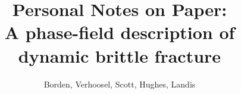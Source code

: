 \documentclass[12pt,3p]{article}
\numberwithin{equation}{section}
\begin{document}
\title{Personal Notes on Paper: \\
	\large{A phase-field description of dynamic brittle fracture}}
\author{Borden, Verhoosel, Scott, Hughes, Landis}
\date{\vspace{-5ex}}
\maketitle

\tableofcontents
\newpage

\end{document}
